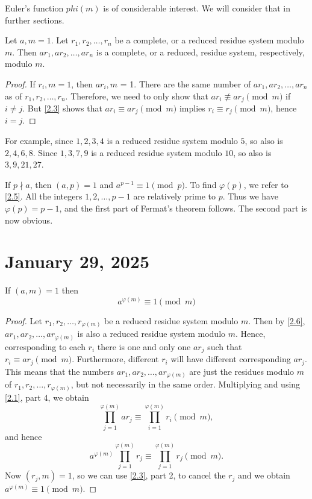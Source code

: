 \documentclass[11pt]{article}
\begin{document}
Euler's function \(phi (m)\) is of considerable interest. We will consider that
in further sections.
\begin{theorem}\label{2.6}
    Let \(a, m = 1\). Let \(r_1, r_2, \ldots, r_n\) be a complete, or a reduced residue system modulo \(m\). Then \(ar_1, ar_2, \ldots, ar_n\) is a complete, or a reduced, residue system, respectively, modulo \(m\).
\end{theorem}
\begin{proof}
    If \(r_i, m = 1\), then \(ar_i, m\) = 1. There are the same number of \(ar_1, ar_2, \ldots, ar_n\) as of \(r_1, r_2, \ldots, r_n\). Therefore, we need to only show that \(ar_i \not \equiv ar_j \pmod{m}\) if \(i \neq j\). But \cref{2.3} shows that \(ar_i \equiv ar_j \pmod{m}\) implies \(r_i \equiv r_j \pmod{m}\), hence \(i = j\).
\end{proof}
\begin{example}
    For example, since \(1, 2, 3, 4\) is a reduced residue system modulo \(5\), so also is \(2, 4, 6, 8\). Since \(1, 3, 7, 9\) is a reduced residue system modulo \(10\), so also is \(3, 9, 21, 27\).
\end{example}

\begin{theorem}\label{2.7}
    If \(p \nmid a\), then \((a, p) = 1\) and \(a^{p-1} \equiv 1 \pmod{p}\). To find \(\varphi(p)\), we refer to \cref{2.5}. All the integers \(1, 2, \ldots, p - 1\) are relatively prime to \(p\). Thus we have \(\varphi(p) = p - 1\), and the first part of Fermat's theorem follows. The second part is now obvious.

\end{theorem}

\section{January 29, 2025}
\begin{theorem}\label{2.8}
    If \((a, m) = 1\) then \[a^{\varphi(m)} \equiv 1\pmod{m}\]
\end{theorem}
\begin{proof}
    Let \(r_1, r_2, \ldots, r_{\varphi(m)}\) be a reduced residue system modulo \(m\). Then by \cref{2.6}, \(ar_1, ar_2, \ldots, ar_{\varphi(m)}\) is also a reduced residue system modulo \(m\). Hence, corresponding to each \(r_i\) there is one and only one \(ar_j\) such that \(r_i \equiv ar_j \pmod{m}\). Furthermore, different \(r_i\) will have different corresponding \(ar_j\). This means that the numbers \(ar_1, ar_2, \ldots, ar_{\varphi(m)}\) are just the residues modulo \(m\) of \(r_1, r_2, \ldots, r_{\varphi(m)}\), but not necessarily in the same order. Multiplying and using \cref{2.1}, part 4, we obtain
    \[
        \prod_{j=1}^{\varphi(m)} ar_j \equiv \prod_{i=1}^{\varphi(m)} r_i \pmod{m},
    \]
    and hence
    \[
        a^{\varphi(m)} \prod_{j=1}^{\varphi(m)} r_j \equiv \prod_{j=1}^{\varphi(m)} r_j \pmod{m}.
    \]
    Now \((r_j, m) = 1\), so we can use \cref{2.3}, part 2, to cancel the
    \(r_j\) and we obtain \(a^{\varphi(m)} \equiv 1 \pmod{m}\).
\end{proof}
\end{document}

